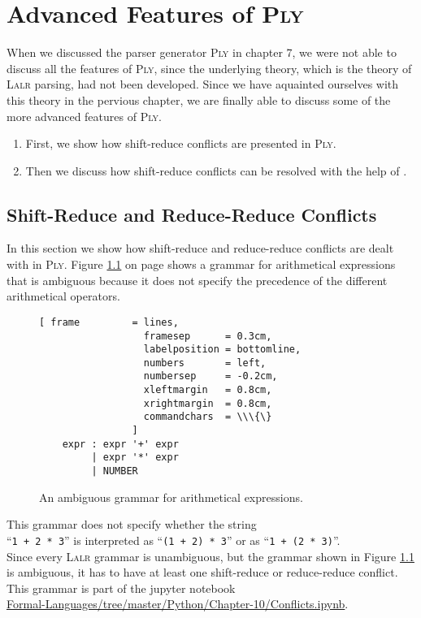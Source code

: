 \chapter{Advanced Features of \textsc{Ply}}
When we discussed the parser generator \textsc{Ply} in chapter 7, we were not able to discuss all the features of
\textsc{Ply}, since the underlying theory, which is the theory of \textsc{Lalr} parsing,  had not been developed.  Since
we have aquainted ourselves with this theory in the pervious chapter, we are finally able to discuss some of the
more advanced features of \textsc{Ply}. 
\begin{enumerate}
\item First, we show how shift-reduce conflicts are presented in \textsc{Ply}.
\item Then we discuss how shift-reduce conflicts can be resolved with the help of
      .
\end{enumerate}

\section{Shift-Reduce and Reduce-Reduce Conflicts}
In this section we show how shift-reduce and reduce-reduce conflicts are dealt with in \textsc{Ply}.
Figure \ref{fig:Conflicts.ipynb} on page \pageref{fig:Conflicts.ipynb} shows a grammar for arithmetical
expressions that is ambiguous because it does not specify the precedence of the different arithmetical
operators.  


\begin{figure}[!ht]
\centering
\begin{Verbatim}[ frame         = lines, 
                  framesep      = 0.3cm, 
                  labelposition = bottomline,
                  numbers       = left,
                  numbersep     = -0.2cm,
                  xleftmargin   = 0.8cm,
                  xrightmargin  = 0.8cm,
                  commandchars  = \\\{\}
                ]
    expr : expr '+' expr
         | expr '*' expr
         | NUMBER      
\end{Verbatim}
\vspace*{-0.3cm}
\caption{An ambiguous grammar for arithmetical expressions.}
\label{fig:Conflicts.ipynb}
\end{figure}
\FloatBarrier

\noindent
This grammar does not specify whether the string
\\[0.2cm]
\hspace*{1.3cm} 
``\texttt{1 + 2 * 3}'' \quad is interpreted as \quad  ``\texttt{(1 + 2) * 3}'' \quad or as \quad ``\texttt{1 +
  (2 * 3)}''. 
\\[0.2cm]
Since every \textsc{Lalr} grammar is unambiguous, but the grammar shown in Figure \ref{fig:Conflicts.ipynb} is
ambiguous,  it has to have at least one shift-reduce or reduce-reduce conflict.  This grammar is part of the
jupyter notebook  
\\[0.2cm]
\hspace*{1.3cm}
\href{https://github.com/karlstroetmann/Formal-Languages/tree/master/Python/Chapter-10/Conflicts.ipynb}{Formal-Languages/tree/master/Python/Chapter-10/Conflicts.ipynb}.


